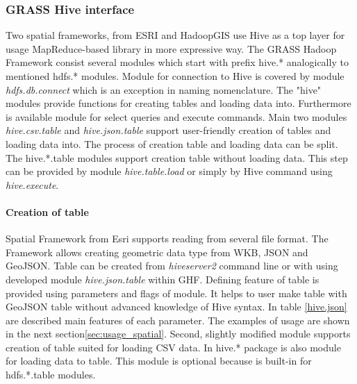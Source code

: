 \documentclass[a4paper,12pt,oneside]{report}
\begin{document}
    \subsubsection{GRASS Hive interface}
    Two spatial frameworks, from ESRI and HadoopGIS use Hive as a top layer for
    usage MapReduce-based library in more expressive way. The GRASS Hadoop Framework
    consist several modules which start with prefix hive.* analogically to mentioned
    hdfs.* modules. Module for connection to Hive is covered by module
    \textit{hdfs.db.connect} which is an exception in naming nomenclature. The
    "hive" modules provide functions for creating tables and loading data into.
    Furthermore is available module for select queries and execute commands. Main
    two modules \textit{hive.csv.table} and \textit{hive.json.table} support user-friendly creation of tables and loading data into. The process of creation table
    and loading data can be split. The hive.*.table modules support creation table
    without loading data. This step can be provided by module \textit{hive.table.load} or
    simply by Hive command using \textit{hive.execute}.
    
    
    \paragraph{Creation of table} Spatial Framework from Esri supports reading  from
    several file format.  The Framework allows creating geometric data type from 
    WKB, JSON and GeoJSON. Table can be created from \textit{hiveserver2} command
    line or with using developed module  \textit{hive.json.table} within GHF. 
    Defining feature of table is provided using parameters and flags of module. It helps
    to user make table with GeoJSON table without advanced knowledge of Hive
    syntax. In table \ref{hive.json} are described main features of each parameter.
    The examples of usage are shown in the next section\ref{sec:usage_spatial}.
    Second, slightly modified module supports creation of table suited for loading
    CSV data. In hive.* package is also module for loading data to table. This
    module is optional because is built-in for hdfs.*.table modules. 

	
	
\end{document}
